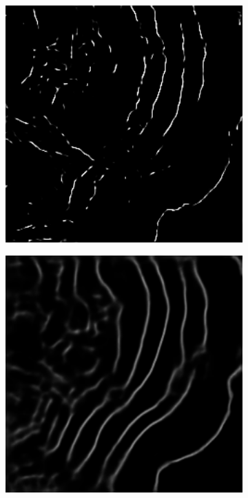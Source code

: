\begin{figure}[!t]
\begin{subfigure}[t]{0.24\textwidth}
        \includegraphics[width=1\textwidth, valign=c]{images/aug-none.png}
        \caption{}
        \label{fig:evalaugnone}
    \end{subfigure}
    \begin{subfigure}[t]{0.24\textwidth}
        \centering
        \includegraphics[width=1\textwidth, valign=c]{images/aug-normal.png}

\end{subfigure}
\end{figure}
